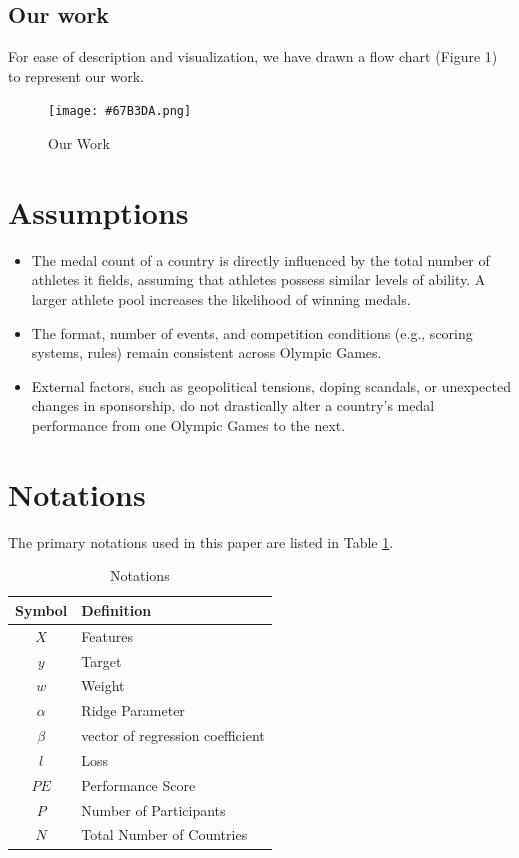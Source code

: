 \documentclass[12pt]{article}  %
\begin{document}
\subsection{Our work}
For ease of description and visualization, we have drawn a flow chart (Figure 1) to represent our work.
\begin{figure}[h]
    \centering
    \texttt{[image: \#67B3DA.png]}
    \caption{Our Work}
    \label{fig:enter-label}
\end{figure}


\section{Assumptions}
\begin{itemize}
\item The medal count of a country is directly influenced by the total number of athletes it fields, assuming that athletes possess similar levels of ability. A larger athlete pool increases the likelihood of winning medals.
\item The format, number of events, and competition conditions (e.g., scoring systems, rules) remain consistent across Olympic Games.
\item External factors, such as geopolitical tensions, doping scandals, or unexpected changes in sponsorship, do not drastically alter a country’s medal performance from one Olympic Games to the next.
\end{itemize}
\section{Notations}
The primary notations used in this paper are listed in Table \ref{tb:notation}.

\begin{table}[!htbp]
\begin{center}
\caption{Notations}
\begin{tabular}{cl}
	\toprule
	\multicolumn{1}{m{3cm}}{\centering Symbol}
	&\multicolumn{1}{m{8cm}}{\centering Definition}\\
	\midrule
	$X$&Features\\
	$y$&Target\\
        $w$&Weight\\
	$\alpha$ &Ridge Parameter\\
        $\beta$ &vector of regression coefficient\\
        $l$&Loss\\
        $PE$&Performance Score\\
        $P$&Number of Participants\\
        $N$&Total Number of Countries\\
        
        
	\bottomrule
\end{tabular}\label{tb:notation}
\end{center}
\end{table}
\end{document}
